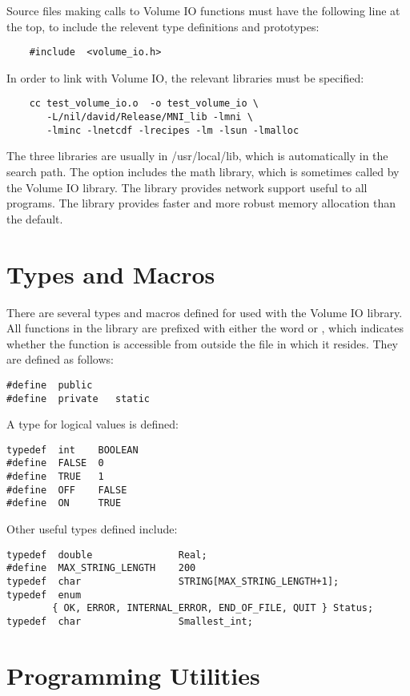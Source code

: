 Source files making calls to Volume IO functions must have the
following line at the top, to include the relevent type definitions and
prototypes:
\begin{verbatim}
    #include  <volume_io.h>
\end{verbatim}

In order to link with Volume IO, the relevant libraries must be
specified:
\begin{verbatim}
    cc test_volume_io.o  -o test_volume_io \
       -L/nil/david/Release/MNI_lib -lmni \
       -lminc -lnetcdf -lrecipes -lm -lsun -lmalloc
\end{verbatim}
The three libraries are usually in /usr/local/lib, which is
automatically in the search path.  The  option includes the
math library, which is sometimes called by the Volume IO library.  The
\name{-lsun} library provides network support useful to all programs.
The \name{-lmalloc} library provides faster and more robust memory
allocation than the default.

\section{Types and Macros}

There are several types and macros defined for used with the Volume IO
library.  All functions in the library are prefixed with either the
word \name{public} or \name{private}, which indicates whether the
function is accessible from outside the file in which it resides.
They are defined as follows:
\begin{verbatim}
#define  public
#define  private   static
\end{verbatim}

A type for logical values is defined:
\begin{verbatim}
typedef  int    BOOLEAN
#define  FALSE  0
#define  TRUE   1
#define  OFF    FALSE
#define  ON     TRUE
\end{verbatim}

Other useful types defined include:
\begin{verbatim}
typedef  double               Real;
#define  MAX_STRING_LENGTH    200
typedef  char                 STRING[MAX_STRING_LENGTH+1];
typedef  enum 
        { OK, ERROR, INTERNAL_ERROR, END_OF_FILE, QUIT } Status;
typedef  char                 Smallest_int;
\end{verbatim}



\section{Programming Utilities}

